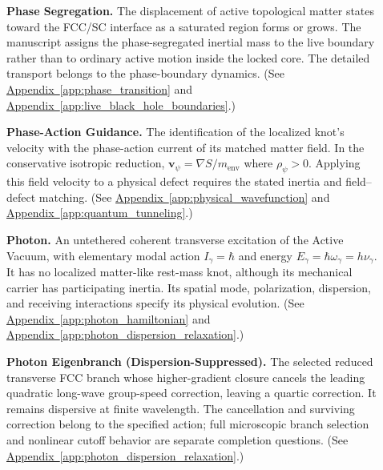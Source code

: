 \begin{description}
\item[] \begin{minipage}[t]{\linewidth}
\textbf{Phase Segregation.} The displacement of active topological matter states toward the FCC/SC interface as a saturated region forms or grows. The manuscript assigns the phase-segregated inertial mass to the live boundary rather than to ordinary active motion inside the locked core. The detailed transport belongs to the phase-boundary dynamics.
(See \hyperref[app:phase_transition]{Appendix~\ref*{app:phase_transition}} and \hyperref[app:live_black_hole_boundaries]{Appendix~\ref*{app:live_black_hole_boundaries}}.)
\end{minipage}

\item[] \begin{minipage}[t]{\linewidth}
\textbf{Phase-Action Guidance.} The identification of the localized knot's velocity with the phase-action current of its matched matter field. In the conservative isotropic reduction, $\mathbf v_\psi=\nabla S/m_{\mathrm{env}}$ where $\rho_\psi>0$. Applying this field velocity to a physical defect requires the stated inertia and field--defect matching.
(See \hyperref[app:physical_wavefunction]{Appendix~\ref*{app:physical_wavefunction}} and \hyperref[app:quantum_tunneling]{Appendix~\ref*{app:quantum_tunneling}}.)
\end{minipage}

\item[] \begin{minipage}[t]{\linewidth}
\textbf{Photon.} An untethered coherent transverse excitation of the Active Vacuum, with elementary modal action $I_\gamma=\hbar$ and energy $E_\gamma=\hbar\omega_\gamma=h\nu_\gamma$. It has no localized matter-like rest-mass knot, although its mechanical carrier has participating inertia. Its spatial mode, polarization, dispersion, and receiving interactions specify its physical evolution.
(See \hyperref[app:photon_hamiltonian]{Appendix~\ref*{app:photon_hamiltonian}} and \hyperref[app:photon_dispersion_relaxation]{Appendix~\ref*{app:photon_dispersion_relaxation}}.)
\end{minipage}

\item[] \begin{minipage}[t]{\linewidth}
\textbf{Photon Eigenbranch (Dispersion-Suppressed).} The selected reduced transverse FCC branch whose higher-gradient closure cancels the leading quadratic long-wave group-speed correction, leaving a quartic correction. It remains dispersive at finite wavelength. The cancellation and surviving correction belong to the specified action; full microscopic branch selection and nonlinear cutoff behavior are separate completion questions.
(See \hyperref[app:photon_dispersion_relaxation]{Appendix~\ref*{app:photon_dispersion_relaxation}}.)
\end{minipage}


\end{description}
